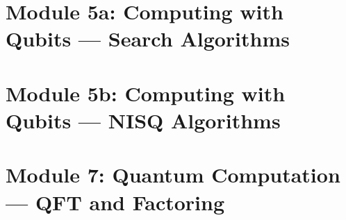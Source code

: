 
\section[Algos1]{Module 5a: Computing with Qubits --- Search Algorithms}


\section[NISQ]{Module 5b: Computing with Qubits --- NISQ Algorithms}


\section[Algos2]{Module 7: Quantum Computation --- QFT and Factoring}

